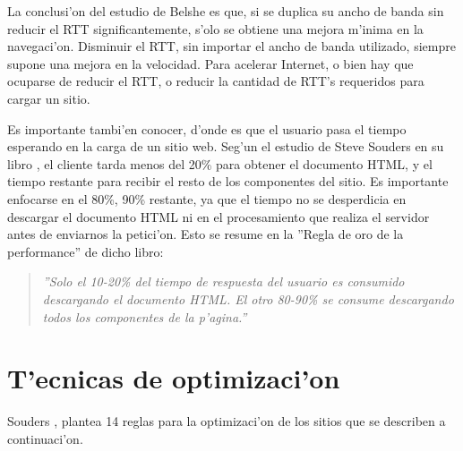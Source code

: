 La conclusi'on del estudio de Belshe es que, si se duplica su ancho de banda sin reducir el RTT significantemente, s'olo se obtiene una mejora m'inima en la navegaci'on. Disminuir el RTT, sin importar el ancho de banda utilizado, siempre supone una mejora en la velocidad. Para acelerar Internet, o bien hay que ocuparse de reducir el RTT, o reducir la cantidad de RTT's requeridos para cargar un sitio.

Es importante tambi'en conocer, d'onde es que el usuario pasa el tiempo esperando en la carga de un sitio web. Seg'un el estudio de Steve Souders en su libro \citep{highPerformanceWebSites}, el cliente tarda menos del 20\% para obtener el documento HTML, y el tiempo restante para recibir el resto de los componentes del sitio. Es importante enfocarse en el 80\%, 90\% restante, ya que el tiempo no se desperdicia en descargar el documento HTML ni en el procesamiento que realiza el servidor antes de enviarnos la petici'on. Esto se resume en la ''Regla de oro de la performance'' de dicho libro:

\begin{quote}

\textit{''Solo el 10-20\% del tiempo de respuesta del usuario es consumido descargando el documento HTML. El otro 80-90\% se consume descargando todos los componentes de la p'agina.''}

\end{quote}

\section{T'ecnicas de optimizaci'on}

Souders \citep{highPerformanceWebSites}, plantea 14 reglas para la optimizaci'on de los sitios que se describen a continuaci'on.

